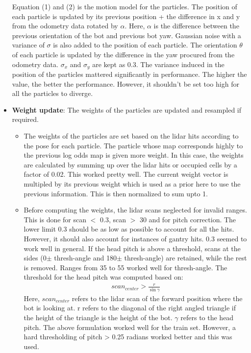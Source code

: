 \documentclass[english]{article}
\begin{document}
\begin{itemize}
Equation (1) and (2) is the motion model for the particles. The position of each particle is updated by its previous position + the difference in x and y from the odometry data rotated by $\alpha$. Here, $\alpha$ is the difference between the previous orientation of the bot and previous bot yaw. Gaussian noise with a variance of $\sigma$ is also added to the position of each particle. The orientation $\theta$ of each particle is updated by the difference in the yaw procured from the odometry data. $\sigma_x$ and $\sigma_y$ are kept as 0.3. The variance induced in the position of the particles mattered significantly in performance. The higher the value, the better the performance. However, it shouldn't be set too high for all the particles to diverge. \\

\item \textbf{Weight update}: The weights of the particles are updated and resampled if required.
\begin{itemize}
	\item The weights of the particles are set based on the lidar hits according to the pose for each particle. The particle whose map corresponds highly to the previous log odds map is given more weight. In this case, the weights are calculated by summing up over the lidar hits or occupied cells by a factor of 0.02. This worked pretty well. The current weight vector is multipled by its previous weight which is used as a prior here to use the previous information. This is then normalized to sum upto 1. 
	\item Before computing the weights, the lidar scans neglected for invalid ranges. This is done for scan $<$ 0.3, scan $>$ 30 and for pitch correction. The lower limit 0.3 should be as low as possible to account for all the hits. However, it should also account for instances of gantry hits. 0.3 seemed to work well in general. If the head pitch is above a threshold, scans at the sides (0\degree $\pm$ thresh-angle and 180\degree $\pm$ thresh-angle) are retained, while the rest is removed. Ranges from 35 to 55 \degree worked well for thresh-angle. The threshold for the head pitch was computed based on:
	\begin{align*}
	scan_{center} > \frac{r}{\sin \gamma}
	\end{align*}
	Here, $scan_{center}$ refers to the lidar scan of the forward position where the bot is looking at. r refers to the diagonal of the right angled triangle if the height of the triangle is the height of the bot. $\gamma$ refers to the head pitch. 
	The above formulation worked well for the train set. However, a hard thresholding of pitch > 0.25 radians worked better and this was used. 
	

\end{itemize}
\end{itemize}
\end{document}
